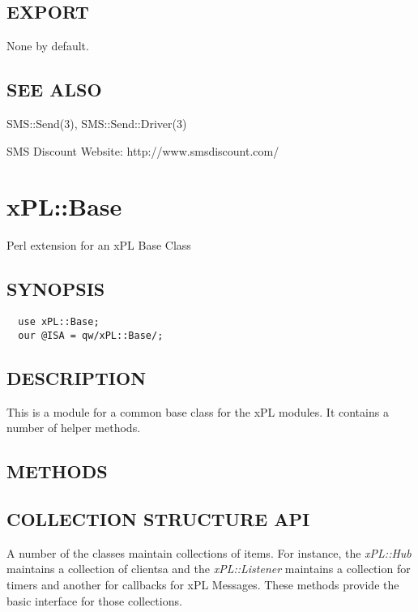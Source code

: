 \subsection*{EXPORT\label{SMS::Send::SMSDiscount_EXPORT}}


None by default.

\subsection*{SEE ALSO\label{SMS::Send::SMSDiscount_SEE_ALSO}}


SMS::Send(3), SMS::Send::Driver(3)



SMS Discount Website: http://www.smsdiscount.com/

\section{xPL::Base\label{xPL::Base}}


Perl extension for an xPL Base Class

\subsection*{SYNOPSIS\label{xPL::Base_SYNOPSIS}}
\begin{verbatim}
  use xPL::Base;
  our @ISA = qw/xPL::Base/;
\end{verbatim}
\subsection*{DESCRIPTION\label{xPL::Base_DESCRIPTION}}


This is a module for a common base class for the xPL modules.  It
contains a number of helper methods.

\subsection*{METHODS\label{xPL::Base_METHODS}}
\subsection*{COLLECTION STRUCTURE API\label{xPL::Base_COLLECTION_STRUCTURE_API}}


A number of the classes maintain collections of items.  For instance,
the \emph{xPL::Hub} maintains a collection of clientsa and the
\emph{xPL::Listener} maintains a collection for timers and another for
callbacks for xPL Messages.  These methods provide the basic interface
for those collections.


